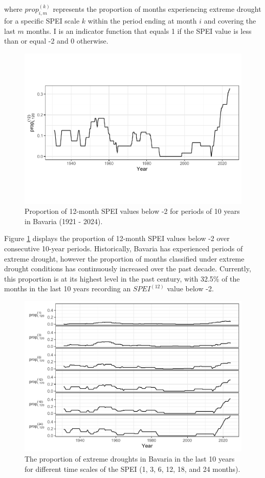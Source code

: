 \documentclass[
]{krantz}
\begin{document}
where \(prop_{i,m}^{(k)}\) represents the proportion of months experiencing extreme drought for a specific SPEI scale \(k\) within the period ending at month \(i\) and covering the last \(m\) months. \(\text{I}\) is an indicator function that equals 1 if the SPEI value is less than or equal -2 and 0 otherwise.

\begin{figure}
\centering
\includegraphics{book_files/figure-latex/extremeDroughts-1.pdf}
\caption{\label{fig:extremeDroughts}Proportion of 12-month SPEI values below -2 for periods of 10 years in Bavaria (1921 - 2024).}
\end{figure}

Figure \ref{fig:extremeDroughts} displays the proportion of 12-month SPEI values below -2 over consecutive 10-year periods. Historically, Bavaria has experienced periods of extreme drought, however the proportion of months classified under extreme drought conditions has continuously increased over the past decade. Currently, this proportion is at its highest level in the past century, with 32.5\% of the months in the last 10 years recording an \(SPEI^{(12)}\) value below -2.

\begin{figure}
\centering
\includegraphics{book_files/figure-latex/extremeDroughts2-1.pdf}
\caption{\label{fig:extremeDroughts2}The proportion of extreme droughts in Bavaria in the last 10 years for different time scales of the SPEI (1, 3, 6, 12, 18, and 24 months).}
\end{figure}
\end{document}
